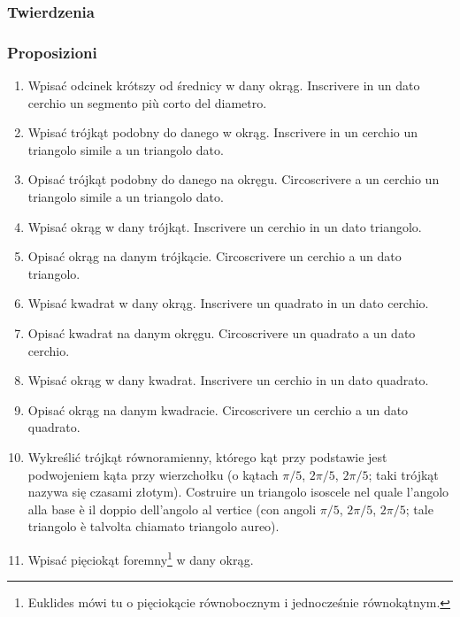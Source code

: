 \subsubsection{Twierdzenia} %
\subsubsection{Proposizioni} %
\begin{enumerate}
	\item [4.1]
	Wpisać odcinek krótszy od średnicy w dany okrąg. %
	Inscrivere in un dato cerchio un segmento più corto del diametro. %
	\item [4.2]
	Wpisać trójkąt podobny do danego w okrąg. %
	Inscrivere in un cerchio un triangolo simile a un triangolo dato. %
	\item [4.3]
	Opisać trójkąt podobny do danego na okręgu. %
	Circoscrivere a un cerchio un triangolo simile a un triangolo dato. %
	\item [4.4]
	Wpisać okrąg w dany trójkąt. %
	Inscrivere un cerchio in un dato triangolo. %
	\item [4.5]
	Opisać okrąg na danym trójkącie. %
	Circoscrivere un cerchio a un dato triangolo. %
	\item [4.6]
	Wpisać kwadrat w dany okrąg. %
	Inscrivere un quadrato in un dato cerchio. %
	\item [4.7]
	Opisać kwadrat na danym okręgu. %
	Circoscrivere un quadrato a un dato cerchio. %
	\item [4.8]
	Wpisać okrąg w dany kwadrat. %
	Inscrivere un cerchio in un dato quadrato. %
	\item [4.9]
	Opisać okrąg na danym kwadracie. %
	Circoscrivere un cerchio a un dato quadrato. %
	\item [4.10]
	Wykreślić trójkąt równoramienny, którego kąt przy podstawie jest podwojeniem kąta przy wierzchołku (o kątach $\pi/5$, $2\pi/5$, $2\pi/5$; taki trójkąt nazywa się czasami złotym). %
	Costruire un triangolo isoscele nel quale l'angolo alla base è il doppio dell'angolo al vertice (con angoli $\pi/5$, $2\pi/5$, $2\pi/5$; tale triangolo è talvolta chiamato triangolo aureo). %
	\item [4.11]
	Wpisać pięciokąt foremny\footnote{Euklides mówi tu o pięciokącie równobocznym i jednocześnie równokątnym.} w dany okrąg. %

\end{enumerate}
